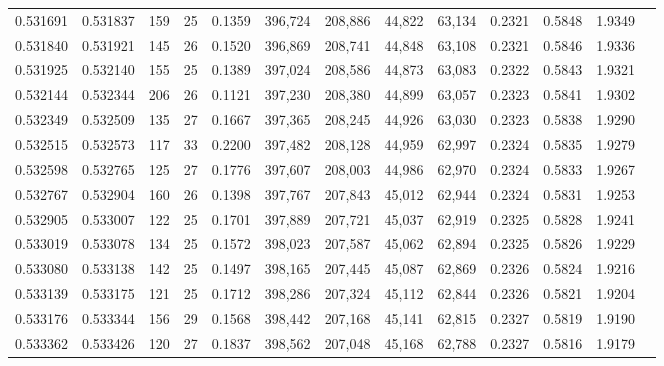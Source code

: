 \begin{tabular}{rrrrrrrrrrrrr}
0.531691 & 0.531837 &   159 &  25 &                                     0.1359 & 396,724 & 208,886 &  44,822 &  63,134 & 0.2321 & 0.5848 & 1.9349 \\
0.531840 & 0.531921 &   145 &  26 &                                     0.1520 & 396,869 & 208,741 &  44,848 &  63,108 & 0.2321 & 0.5846 & 1.9336 \\
0.531925 & 0.532140 &   155 &  25 &                                     0.1389 & 397,024 & 208,586 &  44,873 &  63,083 & 0.2322 & 0.5843 & 1.9321 \\
0.532144 & 0.532344 &   206 &  26 &                                     0.1121 & 397,230 & 208,380 &  44,899 &  63,057 & 0.2323 & 0.5841 & 1.9302 \\
0.532349 & 0.532509 &   135 &  27 &                                     0.1667 & 397,365 & 208,245 &  44,926 &  63,030 & 0.2323 & 0.5838 & 1.9290 \\
0.532515 & 0.532573 &   117 &  33 &                                     0.2200 & 397,482 & 208,128 &  44,959 &  62,997 & 0.2324 & 0.5835 & 1.9279 \\
0.532598 & 0.532765 &   125 &  27 &                                     0.1776 & 397,607 & 208,003 &  44,986 &  62,970 & 0.2324 & 0.5833 & 1.9267 \\
0.532767 & 0.532904 &   160 &  26 &                                     0.1398 & 397,767 & 207,843 &  45,012 &  62,944 & 0.2324 & 0.5831 & 1.9253 \\
0.532905 & 0.533007 &   122 &  25 &                                     0.1701 & 397,889 & 207,721 &  45,037 &  62,919 & 0.2325 & 0.5828 & 1.9241 \\
0.533019 & 0.533078 &   134 &  25 &                                     0.1572 & 398,023 & 207,587 &  45,062 &  62,894 & 0.2325 & 0.5826 & 1.9229 \\
0.533080 & 0.533138 &   142 &  25 &                                     0.1497 & 398,165 & 207,445 &  45,087 &  62,869 & 0.2326 & 0.5824 & 1.9216 \\
0.533139 & 0.533175 &   121 &  25 &                                     0.1712 & 398,286 & 207,324 &  45,112 &  62,844 & 0.2326 & 0.5821 & 1.9204 \\
0.533176 & 0.533344 &   156 &  29 &                                     0.1568 & 398,442 & 207,168 &  45,141 &  62,815 & 0.2327 & 0.5819 & 1.9190 \\
0.533362 & 0.533426 &   120 &  27 &                                     0.1837 & 398,562 & 207,048 &  45,168 &  62,788 & 0.2327 & 0.5816 & 1.9179 \\

\end{tabular}
